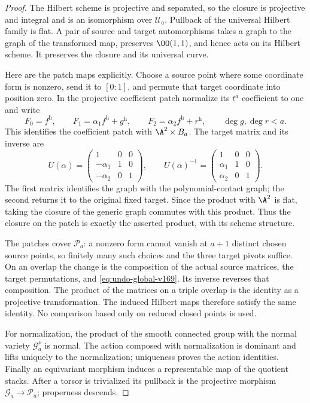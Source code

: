 \begin{proof}
The Hilbert scheme is projective and separated, so the closure is
projective and integral and is an isomorphism over $\mathcal U_a$.
Pullback of the universal Hilbert family is flat. A pair of source and
target automorphisms takes a graph to the graph of the transformed
map, preserves $\OO(1,1)$, and hence acts on its Hilbert scheme.
It preserves the closure and its universal curve.

Here are the patch maps explicitly. Choose a source point where some
coordinate form is nonzero, send it to $[0:1]$, and permute that target
coordinate into position zero. In the projective coefficient patch
normalize its $t^a$ coefficient to one and write
\[
 F_0=f^{\mathrm h},\qquad
 F_1=\alpha_1 f^{\mathrm h}+g^{\mathrm h},\qquad
 F_2=\alpha_2 f^{\mathrm h}+r^{\mathrm h},
 \qquad\deg g,\deg r<a.
\]
This identifies the coefficient patch with $\A^2\times B_a$.
The target matrix and its inverse are
\begin{equation}\label{eq:undo-global-v169}
 U(\alpha)=
 \begin{pmatrix}1&0&0\\-\alpha_1&1&0\\-\alpha_2&0&1\end{pmatrix},
 \qquad
 U(\alpha)^{-1}=
 \begin{pmatrix}1&0&0\\\alpha_1&1&0\\\alpha_2&0&1\end{pmatrix}.
\end{equation}
The first matrix identifies the graph with the polynomial-contact
graph; the second returns it to the original fixed target. Since the
product with $\A^2$ is flat, taking the closure of the generic graph
commutes with this product. Thus the closure on the patch is exactly
the asserted product, with its scheme structure.

The patches cover $\mathcal P_a$: a nonzero form cannot vanish at
$a+1$ distinct chosen source points, so finitely many such choices
and the three target pivots suffice. On an overlap the change is the
composition of the actual source matrices, the target permutations,
and \eqref{eq:undo-global-v169}. Its inverse reverses that composition.
The product of the matrices on a triple overlap is the identity as a
projective transformation. The induced Hilbert maps therefore satisfy
the same identity. No comparison based only on reduced closed points
is used.

For normalization, the product of the smooth connected group with
the normal variety $\mathcal G_a^\nu$ is normal. The action composed
with normalization is dominant and lifts uniquely to the normalization;
uniqueness proves the action identities. Finally an equivariant
morphism induces a representable map of the quotient stacks. After a
torsor is trivialized its pullback is the projective morphism
$\mathcal G_a\to\mathcal P_a$; properness descends.
\end{proof}
